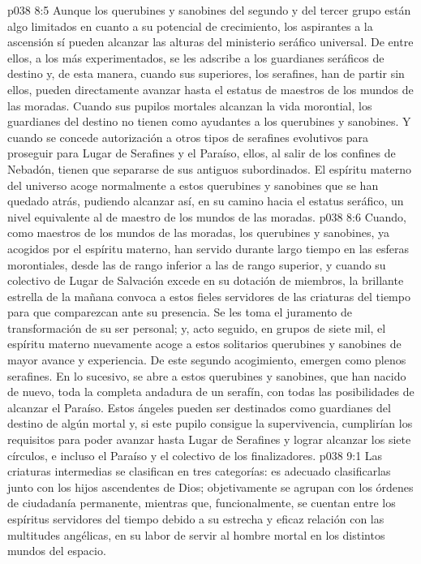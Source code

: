 \vs p038 8:5 \pc Aunque los querubines y sanobines del segundo y del tercer grupo están algo limitados en cuanto a su potencial de crecimiento, los aspirantes a la ascensión sí pueden alcanzar las alturas del ministerio seráfico universal. De entre ellos, a los más experimentados, se les adscribe a los guardianes seráficos de destino y, de esta manera, cuando sus superiores, los serafines, han de partir sin ellos, pueden directamente avanzar hasta el estatus de maestros de los mundos de las moradas. Cuando sus pupilos mortales alcanzan la vida morontial, los guardianes del destino no tienen como ayudantes a los querubines y sanobines. Y cuando se concede autorización a otros tipos de serafines evolutivos para proseguir para Lugar de Serafines y el Paraíso, ellos, al salir de los confines de Nebadón, tienen que separarse de sus antiguos subordinados. El espíritu materno del universo acoge normalmente a estos querubines y sanobines que se han quedado atrás, pudiendo alcanzar así, en su camino hacia el estatus seráfico, un nivel equivalente al de maestro de los mundos de las moradas.
\vs p038 8:6 Cuando, como maestros de los mundos de las moradas, los querubines y sanobines, ya acogidos por el espíritu materno, han servido durante largo tiempo en las esferas morontiales, desde las de rango inferior a las de rango superior, y cuando su colectivo de Lugar de Salvación excede en su dotación de miembros, la brillante estrella de la mañana convoca a estos fieles servidores de las criaturas del tiempo para que comparezcan ante su presencia. Se les toma el juramento de transformación de su ser personal; y, acto seguido, en grupos de siete mil, el espíritu materno nuevamente acoge a estos solitarios querubines y sanobines de mayor avance y experiencia. De este segundo acogimiento, emergen como plenos serafines. En lo sucesivo, se abre a estos querubines y sanobines, que han nacido de nuevo, toda la completa andadura de un serafín, con todas las posibilidades de alcanzar el Paraíso. Estos ángeles pueden ser destinados como guardianes del destino de algún mortal y, si este pupilo consigue la supervivencia, cumplirían los requisitos para poder avanzar hasta Lugar de Serafines y lograr alcanzar los siete círculos, e incluso el Paraíso y el colectivo de los finalizadores.
\vs p038 9:1 Las criaturas intermedias se clasifican en tres categorías: es adecuado clasificarlas junto con los hijos ascendentes de Dios; objetivamente se agrupan con los órdenes de ciudadanía permanente, mientras que, funcionalmente, se cuentan entre los espíritus servidores del tiempo debido a su estrecha y eficaz relación con las multitudes angélicas, en su labor de servir al hombre mortal en los distintos mundos del espacio.
